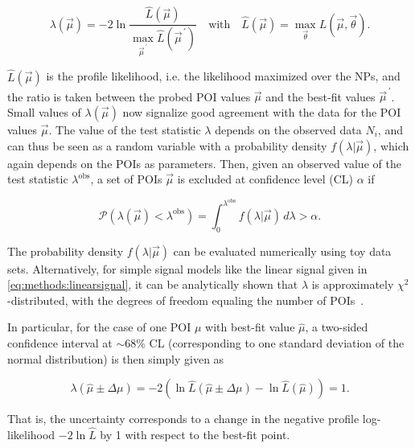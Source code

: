 \begin{equation}
\label{eq:methods:teststat}
    \lambda (\vec{\mu}) = - 2 \ln \frac { \hat{L} (\vec{\mu}) } { \max_{\vec{\mu}^{\,\prime}} \hat{L} (\vec{\mu}^{\,\prime}) } 
    \quad \text{with} \quad 
    \hat{L} (\vec{\mu}) = \max_{\vec{\theta}} L (\vec{\mu}, \vec{\theta}).
\end{equation}

$\hat{L} (\vec{\mu})$ is the profile likelihood, i.e. the likelihood maximized over the NPs, and the ratio is taken between the probed POI values $\vec{\mu}$ and the best-fit values $\vec{\mu}^{\,\prime}$. Small values of $ \lambda (\vec{\mu})$ now signalize good agreement with the data for the POI values $\vec{\mu}$. The value of the test statistic $\lambda$ depends on the observed data $N_i$, and can thus be seen as a random variable with a probability density $f(\lambda | \vec{\mu})$, which again depends on the POIs as parameters. Then, given an observed value of the test statistic $\lambda^{\mathrm{obs}}$, a set of POIs $\vec{\mu}$ is excluded at confidence level (CL) $\alpha$ if 

\begin{equation}
\label{eq:methods:cl}
    \mathcal{P} \left( \lambda (\vec{\mu}) < \lambda^{\mathrm{obs}} \right) = \int_0^{\lambda^{\mathrm{obs}}} f(\lambda | \vec{\mu}) \, d\lambda > \alpha.
\end{equation}

The probability density $f(\lambda | \vec{\mu})$ can be evaluated numerically using toy data sets. Alternatively, for simple signal models like the linear signal given in \cref{eq:methods:linearsignal}, it can be analytically shown that $\lambda$ is approximately $\chi^2$-distributed, with the degrees of freedom equaling the number of POIs~\cite{Wilks:1938dza,Wald:1943}.%

In particular, for the case of one POI $\mu$ with best-fit value $\hat{\mu}$, a two-sided confidence interval at $\sim68\%$ CL (corresponding to one standard deviation of the normal distribution) is then simply given as~\cite{Cowan:2010js}

\begin{equation}
    \lambda(\hat{\mu} \pm \Delta \mu) = -2 (\ln \hat{L} (\hat{\mu} \pm \Delta \mu) - \ln \hat{L} (\hat{\mu})) = 1.
\end{equation}

That is, the uncertainty corresponds to a change in the negative profile log-likelihood $-2 \ln \hat{L}$ by 1 with respect to the best-fit point.


